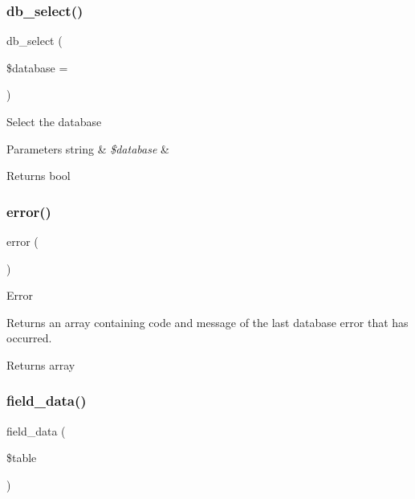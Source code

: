 \subsubsection{\texorpdfstring{db\+\_\+select()}{db\_select()}}
{\footnotesize\ttfamily db\+\_\+select (\begin{DoxyParamCaption}\item[{}]{\$database = {\ttfamily \textquotesingle{}\textquotesingle{}} }\end{DoxyParamCaption})}

Select the database


\begin{DoxyParams}[1]{Parameters}
string & {\em \$database} & \\
\hline
\end{DoxyParams}
\begin{DoxyReturn}{Returns}
bool 
\end{DoxyReturn}
\mbox{\label{class_c_i___d_b__mysql__driver_a43b8d30b879d4f09ceb059b02af2bc02}} 
\subsubsection{\texorpdfstring{error()}{error()}}
{\footnotesize\ttfamily error (\begin{DoxyParamCaption}{ }\end{DoxyParamCaption})}

Error

Returns an array containing code and message of the last database error that has occurred.

\begin{DoxyReturn}{Returns}
array 
\end{DoxyReturn}
\mbox{\label{class_c_i___d_b__mysql__driver_a90355121e1ed009e0efdbd544ab56efa}} 
\subsubsection{\texorpdfstring{field\+\_\+data()}{field\_data()}}
{\footnotesize\ttfamily field\+\_\+data (\begin{DoxyParamCaption}\item[{}]{\$table }\end{DoxyParamCaption})}

